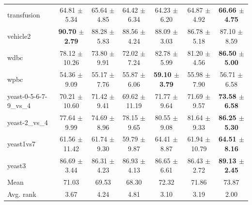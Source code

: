 \begin{table}[t]
\begin{tabular}{lcccccc}
transfusion & 64.81 $\pm$ 5.34 & 65.64 $\pm$ 4.85 & 64.42 $\pm$ 6.34 & 64.23 $\pm$ 6.20 & 64.87 $\pm$ 4.92 & \textbf{66.66 $\pm$ 4.75} \\
vehicle2 & \textbf{90.70 $\pm$ 2.79} & 88.28 $\pm$ 5.83 & 88.56 $\pm$ 4.24 & 88.09 $\pm$ 3.03 & 86.78 $\pm$ 5.18 & 87.10 $\pm$ 8.59 \\
wdbc & 78.12 $\pm$ 10.26 & 73.80 $\pm$ 9.91 & 72.02 $\pm$ 7.24 & 82.78 $\pm$ 5.99 & 81.20 $\pm$ 4.56 & \textbf{86.50 $\pm$ 5.00} \\
wpbc & 54.36 $\pm$ 9.09 & 55.17 $\pm$ 7.76 & 55.87 $\pm$ 6.06 & \textbf{59.10 $\pm$ 3.79} & 55.98 $\pm$ 7.90 & 56.71 $\pm$ 6.58 \\
yeast-0-5-6-7-9\_vs\_4 & 70.21 $\pm$ 10.60 & 71.42 $\pm$ 9.41 & 69.62 $\pm$ 11.19 & 71.77 $\pm$ 9.64 & 71.69 $\pm$ 9.57 & \textbf{73.58 $\pm$ 6.58} \\
yeast-2\_vs\_4 & 77.64 $\pm$ 9.99 & 74.69 $\pm$ 8.96 & 78.15 $\pm$ 9.65 & 80.55 $\pm$ 9.08 & 81.64 $\pm$ 9.33 & \textbf{86.25 $\pm$ 5.30} \\
yeast1vs7 & 61.56 $\pm$ 11.42 & 61.74 $\pm$ 9.30 & 59.79 $\pm$ 9.87 & 64.41 $\pm$ 8.87 & 61.94 $\pm$ 10.79 & \textbf{64.51 $\pm$ 8.16} \\
yeast3 & 86.69 $\pm$ 3.44 & 86.31 $\pm$ 4.23 & 86.93 $\pm$ 4.13 & 86.65 $\pm$ 6.61 & 86.43 $\pm$ 2.72 & \textbf{89.13 $\pm$ 2.45} \\
\midrule
Mean & 71.03 & 69.53 & 68.30 & 72.32 & 71.86 & 73.87 \\
Avg. rank & 3.67 & 4.24 & 4.81 & 3.10 & 3.19 & 2.00 \\
\bottomrule
\end{tabular}
\end{table}